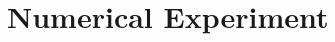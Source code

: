 \documentclass[preprint,12pt]{elsarticle}
\begin{document}
\section{Numerical Experiment}













\end{document}
